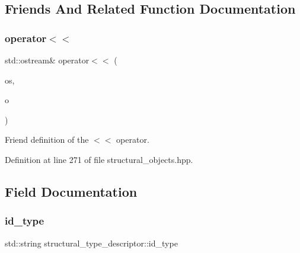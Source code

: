 \subsection{Friends And Related Function Documentation}
\mbox{\label{structstructural__type__descriptor_a5598f0251c669add1d461f39e942841a}} 
\subsubsection{\texorpdfstring{operator$<$$<$}{operator<<}}
{\footnotesize\ttfamily std\+::ostream\& operator$<$$<$ (\begin{DoxyParamCaption}\item[{std\+::ostream \&}]{os,  }\item[{const \hyperlink{structural__objects_8hpp_a219296792577e3292783725961506c83}{structural\+\_\+type\+\_\+descriptor\+Ref}}]{o }\end{DoxyParamCaption})\hspace{0.3cm}{\ttfamily [friend]}}



Friend definition of the $<$$<$ operator. 



Definition at line 271 of file structural\+\_\+objects.\+hpp.



\subsection{Field Documentation}
\mbox{\label{structstructural__type__descriptor_a4e0ad862dabda64db2dd30a88411fae0}} 
\subsubsection{\texorpdfstring{id\+\_\+type}{id\_type}}
{\footnotesize\ttfamily std\+::string structural\+\_\+type\+\_\+descriptor\+::id\+\_\+type}



